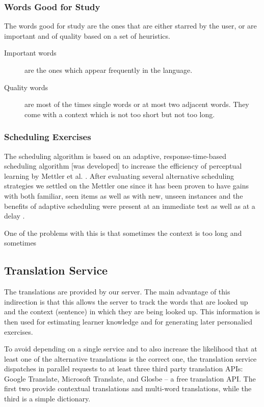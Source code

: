 \subsubsection{Words Good for Study}

The words good for study are the ones that are either starred by the user, or are important and of quality based on a set of heuristics. 

\begin{description}

  \item [Important words] are the ones which appear frequently in the language. 
  
  \item [Quality words] are most of the times single words or at most two adjacent words. They come with a context which is not too short but not too long. 

\end{description}

\subsubsection{Scheduling Exercises}

The scheduling algorithm is based on an adaptive, response-time-based scheduling algorithm [was developed] to increase the efficiency of perceptual learning by Mettler et al. \cite{Mettler14-ARTS}. After evaluating several alternative scheduling strategies we settled on the Mettler one since it has been proven to have gains with both familiar, seen items as well as with new, unseen instances and the benefits of adaptive scheduling were present at an immediate test as well as at a delay \cite{Mettler14-ARTS}.



One of the problems with this is that sometimes the context is too long and sometimes 


\subsection{Translation Service}

The translations are provided by our server. The main advantage of this indirection is that this allows the server to track the words that are looked up and the context (sentence) in which they are being looked up. This information is then used for estimating learner knowledge and for generating later personalied exercises. 

To avoid depending on a single service and to also increase the likelihood that at least one of the alternative translations is the correct one, the translation service dispatches in parallel requests to at least three third party translation APIs: Google Translate, Microsoft Translate, and Glosbe -- a free translation API. The first two provide contextual translations and multi-word translations, while the third is a simple dictionary. 

